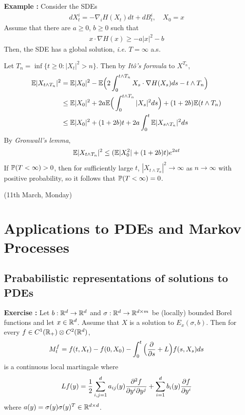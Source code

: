 \documentclass[12pt,a4paper]{article}
\newenvironment{proof}
{\begin{changemargin}{0.5cm}{0.5cm} 
	}%
	{\end{changemargin}
}
\newenvironment{p}
{\begin{proof} 
	}%
	{\end{proof}
}
\begin{document}
\textbf{Example :} Consider the SDEs
\begin{align*}
dX_t^i = -\nabla_i H(X_t) dt + dB_t^i, \quad X_0 =x
\end{align*}
Assume that there are $a\geq 0$, $b\geq 0$ such that
\begin{align*}
x\cdot \nabla H(x) \geq - a|x|^2 -b
\end{align*}
Then, the SDE has a global solution, \textit{i.e.} $T=\infty$ a.s.
\begin{p}
\pf Let $T_n = \inf \{t\geq 0 : |X_t|^2 >n \}$. Then by \emph{It\^o's formula} to $X^{T_n}$,
\begin{align*}
\mathbb{E} |X_{t\wedge T_n}|^2 & = \mathbb{E} |X_0|^2 - \mathbb{E} \Big( 2 \int_0^{t\wedge T_n} X_s \cdot \nabla H(X_s) ds - t\wedge T_n \Big) \\
& \leq \mathbb{E} |X_0|^2 + 2a \mathbb{E} \Big( \int_0^{t\wedge T_n} |X_s|^2 ds \Big) + (1+ 2b) \mathbb{E} (t\wedge T_n) \\
& \leq \mathbb{E} |X_0|^2 + (1+2b)t + 2a\int_0^t \mathbb{E} |X_{s\wedge T_n}|^2 ds  
\end{align*}
By \emph{Gronwall's lemma},
\begin{align*}
\mathbb{E} |X_{t\wedge T_n}|^2 \leq (\mathbb{E} |X_0^2| + (1+2b)t) e^{2at}
\end{align*}
If $\mathbb{P}(T< \infty)>0$, then for sufficiently large $t$, $|X_{t\wedge T_n}|^2 \rightarrow \infty$ as $n\rightarrow \infty$ with positive probability, so it follows that $\mathbb{P}(T< \infty) =0$.

\eop
\end{p}
\s

\newday

(11th March, Monday)

\section{Applications to PDEs and Markov Processes}

\subsection{Prababilistic representations of solutions to PDEs}

\textbf{Exercise :} Let $b: \mathbb{R}^d \rightarrow \mathbb{R}^d$ and $\sigma : \mathbb{R}^d \rightarrow \mathbb{R}^{d\times m}$ be (locally) bounded Borel functions and let $x\in \mathbb{R}^d$. Assume that $X$ is a solution to $E_x(\sigma, b)$. Then for every $f\in C^1(\mathbb{R}_+) \otimes C^2(\mathbb{R}^d)$,
\begin{align*}
M_t^f = f(t, X_t) - f(0, X_0) - \int_0^t \Big( \frac{\partial}{\partial s} + L \Big) f(s, X_s) ds
\end{align*}
is a continuous local martingale where
\begin{align*}
Lf (y) = \frac{1}{2} \sum_{i,j=1}^d a_{ij}(y)\frac{\partial^2 f}{\partial y^i \partial y^j} + \sum_{i=1}^d b_i(y)\frac{\partial f}{\partial y^i}
\end{align*}
where $a(y) = \sigma (y)\sigma(y)^T \in \mathbb{R}^{d\times d}$.
\s
\end{document}
